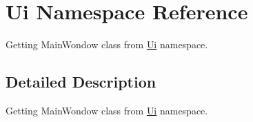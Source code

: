 \hypertarget{namespaceUi}{}\section{Ui Namespace Reference}
\label{namespaceUi}


Getting Main\+Wondow class from \hyperlink{namespaceUi}{Ui} namespace.  




\subsection{Detailed Description}
Getting Main\+Wondow class from \hyperlink{namespaceUi}{Ui} namespace. 